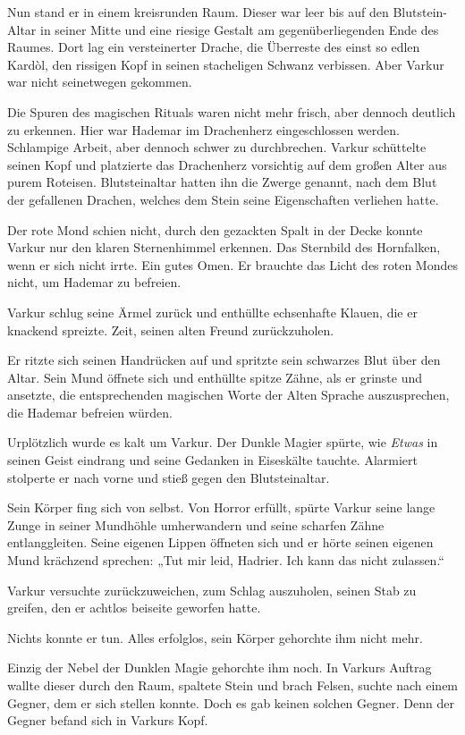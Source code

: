 Nun stand er in einem kreisrunden Raum. Dieser war leer bis auf den Blutstein-Altar in seiner Mitte und eine riesige Gestalt am gegenüberliegenden Ende des Raumes. Dort lag ein versteinerter Drache, die Überreste des einst so edlen Kardòl, den rissigen Kopf in seinen stacheligen Schwanz verbissen. Aber Varkur war nicht seinetwegen gekommen.

Die Spuren des magischen Rituals waren nicht mehr frisch, aber dennoch deutlich zu erkennen. Hier war Hademar im Drachenherz eingeschlossen werden. Schlampige Arbeit, aber dennoch schwer zu durchbrechen. Varkur schüttelte seinen Kopf und platzierte das Drachenherz vorsichtig auf dem großen Alter aus purem Roteisen. Blutsteinaltar hatten ihn die Zwerge genannt, nach dem Blut der gefallenen Drachen, welches dem Stein seine Eigenschaften verliehen hatte.

Der rote Mond schien nicht, durch den gezackten Spalt in der Decke konnte Varkur nur den klaren Sternenhimmel erkennen. Das Sternbild des Hornfalken, wenn er sich nicht irrte. Ein gutes Omen. Er brauchte das Licht des roten Mondes nicht, um Hademar zu befreien.

Varkur schlug seine Ärmel zurück und enthüllte echsenhafte Klauen, die er knackend spreizte. Zeit, seinen alten Freund zurückzuholen.

Er ritzte sich seinen Handrücken auf und spritzte sein schwarzes Blut über den Altar. Sein Mund öffnete sich und enthüllte spitze Zähne, als er grinste und ansetzte, die entsprechenden magischen Worte der Alten Sprache auszusprechen, die Hademar befreien würden.

Urplötzlich wurde es kalt um Varkur. Der Dunkle Magier spürte, wie \textit{Etwas} in seinen Geist eindrang und seine Gedanken in Eiseskälte tauchte. Alarmiert stolperte er nach vorne und stieß gegen den Blutsteinaltar.

Sein Körper fing sich von selbst. Von Horror erfüllt, spürte Varkur seine lange Zunge in seiner Mundhöhle umherwandern und seine scharfen Zähne entlanggleiten. Seine eigenen Lippen öffneten sich und er hörte seinen eigenen Mund krächzend sprechen: „Tut mir leid, Hadrier. Ich kann das nicht zulassen.“

Varkur versuchte zurückzuweichen, zum Schlag auszuholen, seinen Stab zu greifen, den er achtlos beiseite geworfen hatte.

Nichts konnte er tun. Alles erfolglos, sein Körper gehorchte ihm nicht mehr.

Einzig der Nebel der Dunklen Magie gehorchte ihm noch. In Varkurs Auftrag wallte dieser durch den Raum, spaltete Stein und brach Felsen, suchte nach einem Gegner, dem er sich stellen konnte. Doch es gab keinen solchen Gegner. Denn der Gegner befand sich in Varkurs Kopf.

